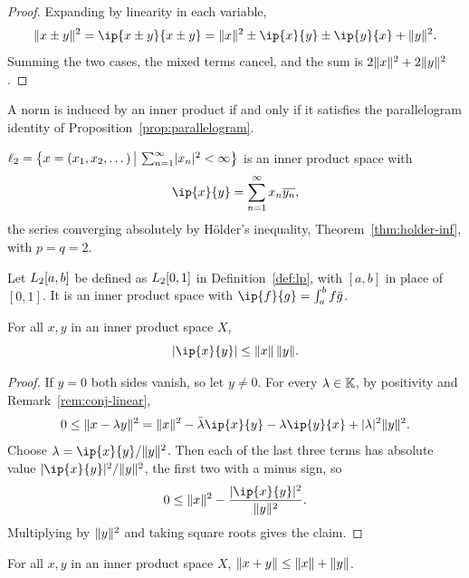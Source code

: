 \begin{proof}
Expanding by linearity in each variable,
\[
  \norm{x \pm y}^2 = \ip{x \pm y}{x \pm y}
  = \norm{x}^2 \pm \ip{x}{y} \pm \ip{y}{x} + \norm{y}^2 .
\]
Summing the two cases, the mixed terms cancel, and the sum is
$2\norm{x}^2 + 2\norm{y}^2$.
\end{proof}

\begin{theorem}\label{thm:jvn}
A norm is induced by an inner product if and only if it satisfies the
parallelogram identity of Proposition~\ref{prop:parallelogram}.
\end{theorem}

\begin{example}\label{ex:l2-ip}
$\lp{2} = \set[\big]{x = (x_1, x_2, \dots) \,\big|\,
\sum_{n=1}^{\infty} \abs{x_n}^2 < \infty}$ is an inner product space with
\[
  \ip{x}{y} = \sum_{n=1}^{\infty} x_n \overline{y_n} ,
\]
the series converging absolutely by Hölder's inequality,
Theorem~\ref{thm:holder-inf}, with $p = q = 2$.
\end{example}

\begin{example}\label{ex:L2-ip}
Let $\Lp{2}[a,b]$ be defined as $\Lp{2}[0,1]$ in Definition~\ref{def:lp},
with $[a,b]$ in place of $[0,1]$. It is an inner product space with
$\ip{f}{g} = \int_a^b f \bar{g}$.
\end{example}

\begin{theorem}\label{thm:cauchy-schwarz}
For all $x, y$ in an inner product space $X$,
\[
  \abs{\ip{x}{y}} \le \norm{x}\,\norm{y} .
\]
\end{theorem}

\begin{proof}
If $y = 0$ both sides vanish, so let $y \ne 0$. For every $\lambda \in \K$,
by positivity and Remark~\ref{rem:conj-linear},
\[
  0 \le \norm{x - \lambda y}^2
  = \norm{x}^2 - \bar{\lambda}\ip{x}{y} - \lambda\ip{y}{x}
    + \abs{\lambda}^2 \norm{y}^2 .
\]
Choose $\lambda = \ip{x}{y} / \norm{y}^2$. Then each of the last three terms
has absolute value $\abs{\ip{x}{y}}^2 / \norm{y}^2$, the first two with a
minus sign, so
\[
  0 \le \norm{x}^2 - \frac{\abs{\ip{x}{y}}^2}{\norm{y}^2} .
\]
Multiplying by $\norm{y}^2$ and taking square roots gives the claim.
\end{proof}

\begin{theorem}\label{thm:ip-triangle}
For all $x, y$ in an inner product space $X$,
$\norm{x + y} \le \norm{x} + \norm{y}$.
\end{theorem}

